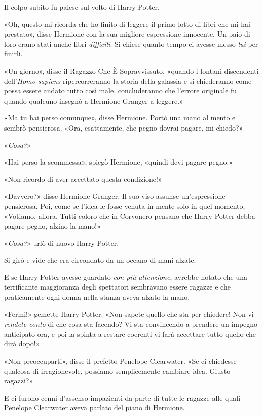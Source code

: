 Il colpo subito fu palese sul volto di Harry Potter.

«Oh, questo mi ricorda che ho finito di leggere il primo lotto di libri che mi hai prestato», disse Hermione con la sua migliore espressione innocente. Un paio di loro erano stati anche libri \textit{difficili}. Si chiese quanto tempo ci avesse messo \textit{lui} per finirli.

«Un giorno», disse il Ragazzo-Che-È-Sopravvissuto, «quando i lontani discendenti dell’\textit{Homo sapiens} ripercorreranno la storia della galassia e si chiederanno come possa essere andato tutto così male, concluderanno che l’errore originale fu quando qualcuno insegnò a Hermione Granger a leggere.»

«Ma tu hai perso comunque», disse Hermione. Portò una mano al mento e sembrò pensierosa. «Ora, esattamente, che pegno dovrai pagare, mi chiedo?»

«\textit{Cosa?}»

«Hai perso la scommessa», spiegò Hermione, «quindi devi pagare pegno.»

«Non ricordo di aver accettato questa condizione!»

«Davvero?» disse Hermione Granger. Il suo viso assunse un’espressione pensierosa. Poi, come se l’idea le fosse venuta in mente solo in quel momento, «Votiamo, allora. Tutti coloro che in Corvonero pensano che Harry Potter debba pagare pegno, alzino la mano!»

«\textit{Cosa?}» urlò di nuovo Harry Potter.

Si girò e vide che era circondato da un oceano di mani alzate.

E se Harry Potter avesse guardato \textit{con più attenzione}, avrebbe notato che una terrificante maggioranza degli spettatori sembravano essere ragazze e che praticamente ogni donna nella stanza aveva alzato la mano.

«Fermi!» gemette Harry Potter. «Non sapete quello che sta per chiedere! Non vi \textit{rendete conto} di che cosa sta facendo? Vi sta convincendo a prendere un impegno anticipato ora, e poi la spinta a restare coerenti vi farà accettare tutto quello che dirà dopo!»

«Non preoccuparti», disse il prefetto Penelope Clearwater. «Se ci chiedesse qualcosa di irragionevole, possiamo semplicemente cambiare idea. Giusto ragazzi?»

E ci furono cenni d’assenso impazienti da parte di tutte le ragazze alle quali Penelope Clearwater aveva parlato del piano di Hermione.

